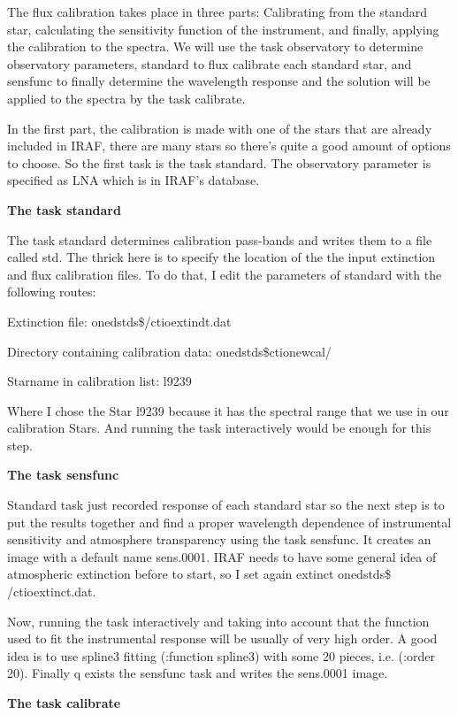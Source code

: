 \documentclass[english]{article}
\begin{document}
The flux calibration takes place in three parts: Calibrating from the standard star, calculating the sensitivity function of the instrument, and finally, applying the calibration to the spectra. We will use the task observatory to determine observatory parameters, standard to flux calibrate each standard star, and sensfunc to finally determine the wavelength response and the solution will be applied to the spectra by the task calibrate.

In the first part, the calibration is made with one of the stars that are already included in IRAF, there are many stars so there's quite a good amount of options to choose. So the first task is the task standard. The observatory parameter is specified as LNA which is in IRAF's database. 

\textbf{The task standard}

The task standard determines calibration pass-bands and writes them to a file called std. The thrick here is to specify the location of the the input extinction and flux calibration files. To do that, I edit the parameters of standard with the following routes:

Extinction file:                              onedstds\$/ctioextindt.dat

Directory containing calibration data:   onedstds\$ctionewcal/

Starname in calibration list:                l9239

Where I chose the Star l9239 because it has the spectral range that we use in our calibration Stars. And running the task interactively would be enough for this step.

\textbf{The task sensfunc}

Standard task just recorded response of each standard star so the next step is to put the results together and find a proper wavelength dependence of instrumental sensitivity and atmosphere transparency using the task sensfunc. It creates an image with a default name sens.0001. IRAF needs to have some general idea of atmospheric extinction before to start, so I set again extinct onedstds\$ /ctioextinct.dat.

Now, running the task interactively and taking into account that the function used to fit the instrumental response will be usually of very high order. A good idea is to use spline3 fitting (:function spline3) with some 20 pieces, i.e. (:order 20).
Finally q exists the sensfunc task and writes the sens.0001 image.

\textbf{The task calibrate}
\end{document}
